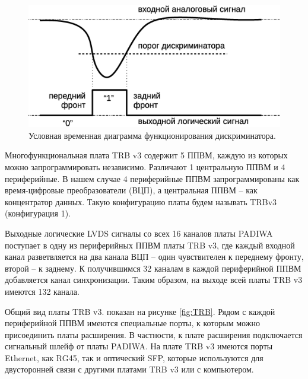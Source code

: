 \begin{figure}
\includegraphics[width=1.0\textwidth]{pictures/6_Discrimination_rus.eps}
\caption{Условная временная диаграмма функционирования дискриминатора.}
\label{fig:Discrimination}
\end{figure}

Многофункциональная плата TRB v3 содержит 5 ППВМ, каждую из которых можно запрограммировать независимо. Различают 1 центральную ППВМ и 4 периферийные. В нашем случае 4 периферийные ППВМ запрограммированы как время-цифровые преобразователи (ВЦП), а центральная ППВМ – как концентратор данных. Такую конфигурацию платы будем называть TRBv3 (конфигурация 1).

Выходные логические LVDS сигналы со всех 16 каналов платы PADIWA поступает в одну из периферийных ППВМ платы TRB v3, где каждый входной канал разветвляется на два канала ВЦП – один чувствителен к переднему фронту, второй – к заднему. К получившимся 32 каналам в каждой периферийной ППВМ добавляется канал синхронизации. Таким образом, на выходе всей платы TRB v3 имеются 132 канала.

Общий вид платы TRB v3. показан на рисунке \ref{fig:TRB}. Рядом с каждой периферийной ППВМ имеются специальные порты, к которым можно присоединить платы расширения. В частности, к плате расширения подключается сигнальный шлейф от платы PADIWA. На плате TRB v3 имеются порты Ethernet, как RG45, так и оптический SFP, которые используются для двусторонней связи с другими платами TRB v3 или с компьютером.

